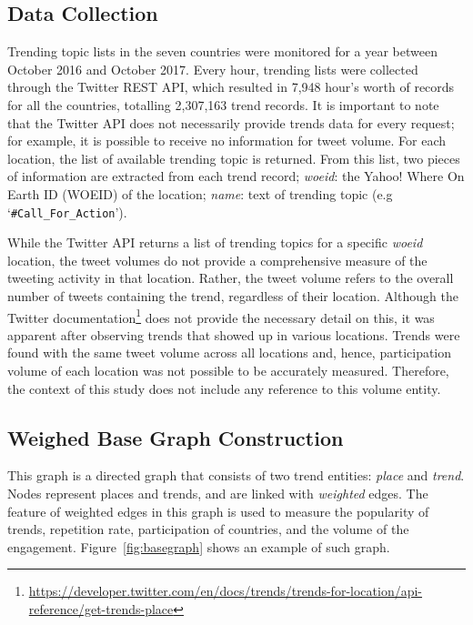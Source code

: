 \documentclass[conference]{IEEEtran}
\begin{document}
\subsection{Data Collection}

Trending topic lists in the seven countries were monitored for a year
between October 2016 and October 2017. Every hour, trending lists were
collected through the Twitter REST API, which resulted in 7,948 hour's
worth of records for all the countries, totalling 2,307,163 trend
records. It is important to note that the Twitter API does not
necessarily provide trends data for every request; for example, it is
possible to receive no information for tweet volume. For each
location, the list of available trending topic is returned. From this
list, two pieces of information are extracted from each trend record;
{\emph{woeid}}: the Yahoo! Where On Earth ID (WOEID) of the location;
{\emph{name}}: text of trending topic (e.g
`{\texttt{\#Call\_For\_Action}}').


While the Twitter API returns a list of trending topics for a specific
{\emph{woeid}} location, the tweet volumes do not provide a
comprehensive measure of the tweeting activity in that
location. Rather, the tweet volume refers to the overall number of
tweets containing the trend, regardless of their location. Although
the Twitter
documentation\footnote{\url{https://developer.twitter.com/en/docs/trends/trends-for-location/api-reference/get-trends-place}}
does not provide the necessary detail on this, it was apparent after
observing trends that showed up in various locations. Trends were
found with the same tweet volume across all locations and, hence,
participation volume of each location was not possible to be
accurately measured. Therefore, the context of this study does not
include any reference to this volume entity.

\subsection{Weighed Base Graph Construction}

This graph is a directed graph that consists of two trend entities:
{\emph{place}} and {\emph{trend}}. Nodes represent places and
trends, and are linked with {\emph{weighted}} edges. The feature 
of weighted edges in this graph is used to measure the popularity 
of trends, repetition rate, participation of countries, and the volume 
of the engagement. Figure~\ref{fig:basegraph} shows an example 
of such graph.
\end{document}
